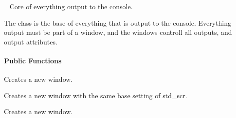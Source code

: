 \documentclass[letterpaper,10pt,english]{sphinxmanual}
\begin{document}

\begin{fulllineitems}
\label{\detokenize{index:_CPPv2N7ostendo6WindowE}}%
\pysigstartmultiline
{}\label{\detokenize{index:Pessumclassostendo_1_1Window}}%
\pysigstopmultiline~
Core of everything output to the console. 

The {\hyperref[\detokenize{index:Pessumclassostendo_1_1Window}]{}} class is the base of everything that is output to the console. Everything output must be part of a window, and the windows controll all outputs, and output attributes. 
\paragraph{Public Functions}

\begin{fulllineitems}
\label{\detokenize{index:_CPPv2N7ostendo6Window6WindowEv}}%
\pysigstartmultiline
{}\label{\detokenize{index:Pessumclassostendo_1_1Window_1a3e01eaa1fdbbb8be629165078169b60c}}%
\pysigstopmultiline
Creates a new window. 

Creates a new window with the same base setting of std\_scr. \begin{description}
\item[{}] \leavevmode
{\hyperref[\detokenize{index:Pessumnamespaceostendo_1a4c5850c8a109e159e874ecce8a5dc62a}]{}} 

\end{description}


\end{fulllineitems}


\begin{fulllineitems}
\label{\detokenize{index:_CPPv2N7ostendo6Window6WindowEii}}%
\pysigstartmultiline
{}\label{\detokenize{index:Pessumclassostendo_1_1Window_1a080f0b58aef84dbda345d1f8b3591871}}%
\pysigstopmultiline
Creates a new window. 


\end{fulllineitems}
\end{fulllineitems}
\end{document}
